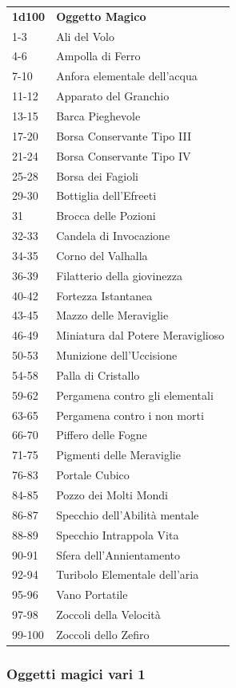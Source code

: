 \begin{multicols}{2}
\begin{tabularx}{0.45\textwidth}{lX}
\textbf{1d100} & \textbf{Oggetto Magico}\\
1-3 &Ali del Volo\\
4-6 &Ampolla di Ferro\\
7-10 &Anfora elementale dell’acqua\\
11-12& Apparato del Granchio\\
13-15& Barca Pieghevole\\
17-20& Borsa Conservante Tipo III\\
21-24& Borsa Conservante Tipo IV\\
25-28& Borsa dei Fagioli\\
29-30& Bottiglia dell'Efreeti\\
31 &Brocca delle Pozioni\\
32-33& Candela di Invocazione\\
34-35 &Corno del Valhalla\\
36-39 &Filatterio della giovinezza\\
40-42 &Fortezza Istantanea\\
43-45 &Mazzo delle Meraviglie\\
46-49 &Miniatura dal Potere Meraviglioso\\
50-53 &Munizione dell'Uccisione\\
54-58 &Palla di Cristallo\\
59-62 &Pergamena contro gli elementali\\
63-65 &Pergamena contro i non morti\\
66-70 &Piffero delle Fogne\\
71-75 &Pigmenti delle Meraviglie\\
76-83 &Portale Cubico\\
84-85 &Pozzo dei Molti Mondi\\
86-87 &Specchio dell’Abilità mentale\\
88-89 &Specchio Intrappola Vita\\
90-91 &Sfera dell'Annientamento\\
92-94 &Turibolo Elementale dell’aria\\
95-96 &Vano Portatile\\
97-98 &Zoccoli della Velocità\\
99-100 &Zoccoli dello Zefiro\\
\end{tabularx}

\medskip

\subsubsection{Oggetti magici vari 1}


\end{multicols}
